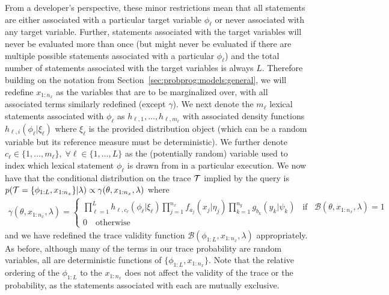 From a developer's perspective, these minor restrictions mean that all \sample statements are
either associated with a particular target variable $\phi_{\ell}$ or never associated with any target 
variable. Further, \sample
statements associated with the target variables will never be evaluated more than once (but might never
be evaluated if there are multiple possible \sample statements associated with a particular $\phi_{\ell}$) and
the total number of \sample statements associated with the target variables is always $L$.
Therefore building on the notation from Section~\ref{sec:probprog:models:general}, we will redefine $x_{1:n_x}$
as the variables that are to be marginalized over, with all associated terms similarly redefined (except $\gamma$).
We next denote the $m_{\ell}$ lexical \sample statements associated with $\phi_{\ell}$ as 
$h_{\ell,1},\dots,h_{\ell,m_{\ell}}$ with associated density functions $h_{\ell,i}(\phi_{\ell} | \xi_{\ell})$ where
$\xi_{\ell}$ is the provided distribution object (which can be a random variable but its reference measure
must be deterministic).  We further denote $c_{\ell} \in \{1,\dots,m_{\ell}\}, \; 
\forall \ell \in \{1,\dots,L\}$ as the (potentially random) variable used to index which lexical \sample statement
$\phi_{\ell}$ is drawn from in a particular execution.  We now have that the conditional distribution on the trace $\mathcal{T}$ implied
by the query is $p(\mathcal{T} = \{\phi_{1:L},x_{1:n_x}\} | \lambda) \propto \gamma(\theta,x_{1:n_x}, \lambda)$
where
\begin{align}
\label{eq:bopp:joint}
\gamma(\theta,x_{1:n_x}, \lambda) = \begin{cases}
\prod_{\ell=1}^{L}
h_{\ell,c_{\ell}} (\phi_{\ell} | \xi_{\ell})
\prod_{j=1}^{n_x} 
f_{a_j}(x_j | \eta_j)
\prod_{k=1}^{n_y}
g_{b_k}(y_k | \psi_k) \;\;\; \text{if} \;\;\; \mathcal{B}(\theta,x_{1:n_x},\lambda)=1 \\
0 \quad \text{otherwise}
\end{cases}
\end{align}
and we have redefined the trace validity function $\mathcal{B}(\phi_{1:L},x_{1:n_x},\lambda)$ appropriately.
As before, although many of the terms in our trace probability are random variables, all are deterministic
functions of $\{\phi_{1:L},x_{1:n_x}\}$.  Note that the relative ordering of the $\phi_{1:L}$ to the $x_{1:n_x}$
does not affect the validity of the trace or the probability, as the \sample statements associated with
each are mutually exclusive.

